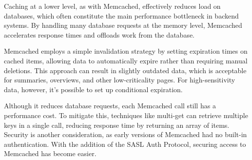Caching at a lower level, as with Memcached, effectively reduces load on databases, which often constitute the main performance bottleneck in backend systems. 
By handling many database requests at the memory level, Memcached accelerates response times and offloads work from the database.

Memcached employs a simple invalidation strategy by setting expiration times on cached items, allowing data to automatically expire rather than requiring manual deletions. 
This approach can result in slightly outdated data, which is acceptable for summaries, overviews, and other low-criticality pages. 
For high-sensitivity data, however, it's possible to set up conditional expiration.

Although it reduces database requests, each Memcached call still has a performance cost.
To mitigate this, techniques like multi-get can retrieve multiple keys in a single call, reducing response time by returning an array of items. 
Security is another consideration, as early versions of Memcached had no built-in authentication. With the addition of the SASL Auth Protocol, securing access to Memcached has become easier.